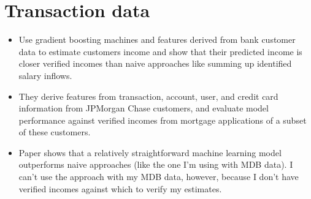 
\section{Transaction data}%
\label{sec:transaction_data}


\citet{farrell2020estimating}
\begin{itemize}
    \item Use gradient boosting machines and features derived from bank
        customer data to estimate customers income and show that their
        predicted income is closer verified incomes than naive approaches like
        summing up identified salary inflows.

    \item They derive features from transaction, account, user, and credit card
        information from JPMorgan Chase customers, and evaluate model
        performance against verified incomes from mortgage applications of a
        subset of these customers.

    \item Paper shows that a relatively straightforward machine learning model
        outperforms naive approaches (like the one I'm using with MDB data). I
        can't use the approach with my MDB data, however, because I don't have
        verified incomes against which to verify my estimates.
\end{itemize}
